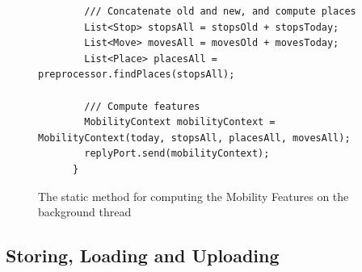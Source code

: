 \begin{figure}
\begin{verbatim}
        /// Concatenate old and new, and compute places
        List<Stop> stopsAll = stopsOld + stopsToday;
        List<Move> movesAll = movesOld + movesToday;
        List<Place> placesAll = preprocessor.findPlaces(stopsAll);

        /// Compute features
        MobilityContext mobilityContext = MobilityContext(today, stopsAll, placesAll, movesAll);
        replyPort.send(mobilityContext);
      }
    \end{verbatim}
    \caption{The static method for computing the Mobility Features on the background thread}
    \label{fig:async-computation}
\end{figure}

\subsection{Storing, Loading and Uploading}
